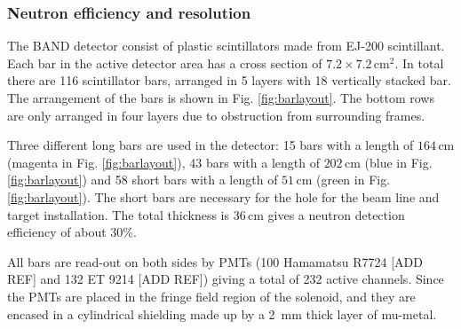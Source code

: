 \documentclass[review]{elsarticle}
\begin{document}
\subsubsection{Neutron efficiency and resolution}







\iffalse

The BAND detector consist of plastic scintillators made from  EJ-200 scintillant. Each bar in the active detector area has a cross section of $7.2 \times 7.2\,\mathrm{cm}^{2}$. In total there are 116 scintillator bars, arranged in 5 layers with 18 vertically stacked bar. The arrangement of the bars is shown in Fig. \ref{fig:barlayout}. The bottom rows are only arranged in four layers due to obstruction from surrounding frames.

Three different long bars are used in the detector: 15 bars with a length of $164\,\mathrm{cm}$ (magenta in Fig. \ref{fig:barlayout}), 43 bars with a length of $202\,\mathrm{cm}$ (blue in Fig. \ref{fig:barlayout}) and 58 short bars with a length of $51\,\mathrm{cm}$ (green in Fig. \ref{fig:barlayout}). The short bars are necessary for the hole for the beam line and target installation. The total thickness is $36\,\mathrm{cm}$ gives a neutron detection efficiency of about 30\%.

All bars are read-out on both sides by PMTs (100 Hamamatsu R7724  [ADD REF] and 132 ET 9214  [ADD REF]) giving a total of 232 active channels. Since the PMTs are placed in the fringe field region of the solenoid, and they are encased in a cylindrical shielding made up by a \SI{2}{\milli\metre} thick layer of mu-metal.
\end{document}
